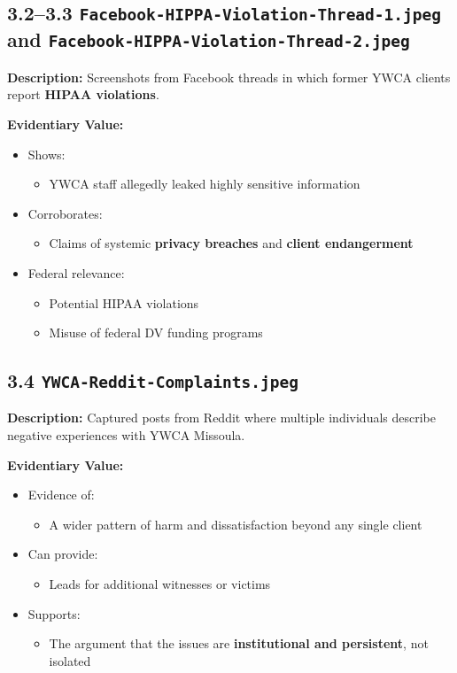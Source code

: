 \documentclass[11pt, letterpaper]{article}
\begin{document}
\subsection{3.2--3.3 \texttt{Facebook-HIPPA-Violation-Thread-1.jpeg} and \texttt{Facebook-HIPPA-Violation-Thread-2.jpeg}}

\textbf{Description:} Screenshots from Facebook threads in which former YWCA clients report \textbf{HIPAA violations}.

\textbf{Evidentiary Value:}

\begin{itemize}[leftmargin=*]
  \item Shows:
    \begin{itemize}
      \item YWCA staff allegedly leaked highly sensitive information
    \end{itemize}
  \item Corroborates:
    \begin{itemize}
      \item Claims of systemic \textbf{privacy breaches} and \textbf{client endangerment}
    \end{itemize}
  \item Federal relevance:
    \begin{itemize}
      \item Potential HIPAA violations
      \item Misuse of federal DV funding programs
    \end{itemize}
\end{itemize}

\subsection{3.4 \texttt{YWCA-Reddit-Complaints.jpeg}}

\textbf{Description:} Captured posts from Reddit where multiple individuals describe negative experiences with YWCA Missoula.

\textbf{Evidentiary Value:}

\begin{itemize}[leftmargin=*]
  \item Evidence of:
    \begin{itemize}
      \item A wider pattern of harm and dissatisfaction beyond any single client
    \end{itemize}
  \item Can provide:
    \begin{itemize}
      \item Leads for additional witnesses or victims
    \end{itemize}
  \item Supports:
    \begin{itemize}
      \item The argument that the issues are \textbf{institutional and persistent}, not isolated
    \end{itemize}
\end{itemize}
\end{document}
